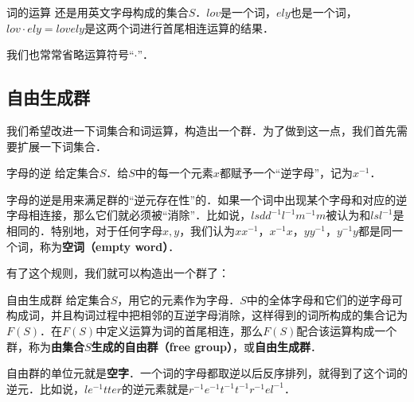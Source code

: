 \begin{example}{词的运算}
还是用英文字母构成的集合$S$．$lov$是一个词，$ely$也是一个词，$lov\cdot ely=lovely$是这两个词进行首尾相连运算的结果．
\end{example}

我们也常常省略运算符号“$\cdot$”．

\subsection{自由生成群}

我们希望改进一下词集合和词运算，构造出一个群．为了做到这一点，我们首先需要扩展一下词集合．

\begin{definition}{字母的逆}
给定集合$S$．给$S$中的每一个元素$x$都赋予一个“逆字母”，记为$x^{-1}$．
\end{definition}

字母的逆是用来满足群的“逆元存在性”的．如果一个词中出现某个字母和对应的逆字母相连接，那么它们就必须被“消除”．比如说，$lsdd^{-1}l^{-1}m^{-1}m$被认为和$lsl^{-1}$是相同的．特别地，对于任何字母$x, y$，我们认为$xx^{-1}$，$x^{-1}x$，$yy^{-1}$，$y^{-1}y$都是同一个词，称为\textbf{空词（empty word）}．

有了这个规则，我们就可以构造出一个群了：

\begin{theorem}{自由生成群}
给定集合$S$，用它的元素作为字母．$S$中的全体字母和它们的逆字母可构成词，并且构词过程中把相邻的互逆字母消除，这样得到的词所构成的集合记为$F(S)$．在$F(S)$中定义运算为词的首尾相连，那么$F(S)$配合该运算构成一个群，称为\textbf{由集合$S$生成的自由群（free group）}，或\textbf{自由生成群}．
\end{theorem}

自由群的单位元就是\textbf{空字}．一个词的字母都取逆以后反序排列，就得到了这个词的逆元．比如说，$le^{-1}tter$的逆元素就是$r^{-1}e^{-1}t^{-1}t^{-1}r^{-1}el^{-1}$．

